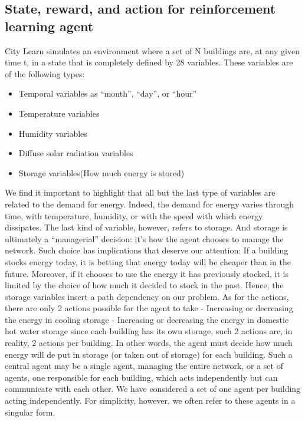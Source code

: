 \documentclass{article}
\begin{document}
\subsection{State, reward, and action for reinforcement learning agent}
\label{sec:sra}

City Learn simulates an environment where a set of N buildings are, at any given time t, in a state that is completely defined by 28 variables. These variables are of the following types:
\begin{itemize}
\item Temporal variables as “month”, “day”, or “hour”
\item Temperature variables
\item Humidity variables
\item Diffuse solar radiation variables
\item Storage variables(How much energy is stored)
\end{itemize}
\newline

We find it important to highlight that all but the last type of variables are related to the demand for energy. Indeed, the demand for energy varies through time, with temperature, humidity, or with the speed with which energy dissipates. The last kind of variable, however, refers to storage. And storage is ultimately a “managerial” decision: it’s how the agent chooses to manage the network. Such choice has implications that deserve our attention: If a building stocks energy today, it is betting that energy today will be cheaper than in the future. Moreover, if it chooses to use the energy it has previously stocked, it is limited by the choice of how much it decided to stock in the past. Hence, the storage variables insert a path dependency on our problem.
As for the actions, there are only 2 actions possible for the agent to take - Increasing or decreasing the energy in cooling storage - Increasing or decreasing the energy in domestic hot water storage since each building has its own storage, such 2 actions are, in reality, 2 actions per building. In other words, the agent must decide how much energy will de put in storage (or taken out of storage) for each building. Such a central agent may be a single agent, managing the entire network, or a set of agents, one responsible for each building, which acts independently but can communicate with each other. We have considered a set of one agent per building acting independently. For simplicity, however, we often refer to these agents in a singular form.
\end{document}
